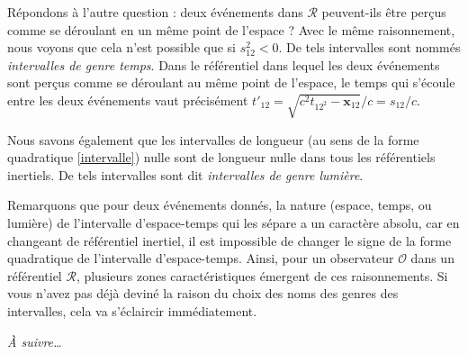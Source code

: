 		Répondons à l'autre question : deux événements dans $\mathscr{R}$ peuvent-ils être perçus comme se déroulant en un même point de l'espace ? Avec le même raisonnement, nous voyons que cela n'est possible que si $s_{12}^2<0$. De tels intervalles sont nommés \emph{intervalles de genre temps}. Dans le référentiel dans lequel les deux événements sont perçus comme se déroulant au même point de l'espace, le temps qui s'écoule entre les deux événements vaut précisément $t'_{12}=\sqrt{c^2t_{12^2}-\bm{x}_{12}}/c=s_{12}/c$. 

		Nous savons également que les intervalles de longueur (au sens de la forme quadratique \eqref{intervalle}) nulle sont de longueur nulle dans tous les référentiels inertiels. De tels intervalles sont dit \emph{intervalles de genre lumière}. 

		Remarquons que pour deux événements donnés, la nature (espace, temps, ou lumière) de l'intervalle d'espace-temps qui les sépare a un caractère absolu, car en changeant de référentiel inertiel, il est impossible de changer le signe de la forme quadratique de l'intervalle d'espace-temps. Ainsi, pour un observateur $\mathscr{O}$ dans un référentiel $\mathscr{R}$, plusieurs zones caractéristiques émergent de ces raisonnements. Si vous n'avez pas déjà deviné la raison du choix des noms des genres des intervalles, cela va s'éclaircir immédiatement.

		\emph{À suivre\ldots}

